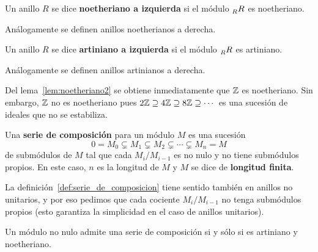 \begin{definition}
	Un anillo $R$ se dice \textbf{noetheriano a izquierda} si el módulo 
	$\prescript{}{R}R$ es noetheriano.
\end{definition}

Análogamente se definen anillos noetherianos a derecha.

\begin{definition}
	Un anillo $R$ se dice \textbf{artiniano a izquierda} si el módulo
	$\prescript{}{R}R$ es artiniano.
\end{definition}

Análogamente se definen anillos artinianos a derecha.

\begin{example}
	Del lema~\ref{lem:noetheriano2} se obtiene inmediatamente que $\mathbb{Z}$ es
	noetheriano. Sin embargo, $\mathbb{Z}$ no es noetheriano pues $2\mathbb{Z}\supseteq
	4\mathbb{Z}\supseteq 8\mathbb{Z}\supseteq\cdots$ es una sucesión de ideales que no se
	estabiliza.
\end{example}

\begin{definition}
	\label{def:serie_de_composicion}
	Una \textbf{serie de composición} para un módulo $M$ es una sucesión
	\[
		0=M_0\subsetneq M_1\subsetneq M_2\subsetneq\cdots\subsetneq M_n=M
	\]
	de submódulos de $M$ tal que cada $M_i/M_{i-1}$ es no nulo y no tiene
	submódulos propios. En este caso, $n$ es la longitud de $M$ y $M$ se dice 
	de \textbf{longitud finita}.
\end{definition}

La definición~\ref{def:serie_de_composicion} tiene sentido también en anillos
no unitarios, y por eso pedimos que cada cociente $M_i/M_{i-1}$ no tenga
submódulos propios (esto garantiza la simplicidad en el caso de anillos
unitarios).

\begin{theorem}
	\label{thm:serie_de_composicion}
	Un módulo no nulo admite una serie de composición si y sólo si es artiniano
	y noetheriano.
\end{theorem}


